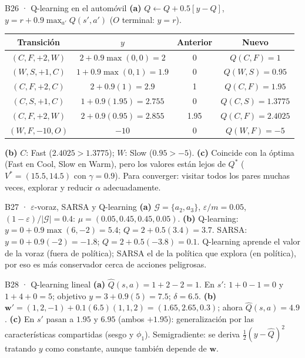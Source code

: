 \begin{solucion}{B26 · Q-learning en el automóvil}
\textbf{(a)} $Q\leftarrow Q+0.5[y-Q]$, $y=r+0.9\max_{a'}Q(s',a')$ ($O$ terminal: $y=r$).
\begin{center}\small
\begin{tabular}{c|c|c|c}
Transición & $y$ & Anterior & Nuevo\\\hline
$(C,F,+2,W)$ & $2+0.9\max(0,0)=2$ & 0 & $Q(C,F)=1$\\
$(W,S,+1,C)$ & $1+0.9\max(0,1)=1.9$ & 0 & $Q(W,S)=0.95$\\
$(C,F,+2,C)$ & $2+0.9(1)=2.9$ & 1 & $Q(C,F)=1.95$\\
$(C,S,+1,C)$ & $1+0.9(1.95)=2.755$ & 0 & $Q(C,S)=1.3775$\\
$(C,F,+2,W)$ & $2+0.9(0.95)=2.855$ & 1.95 & $Q(C,F)=2.4025$\\
$(W,F,-10,O)$ & $-10$ & 0 & $Q(W,F)=-5$
\end{tabular}
\end{center}
\textbf{(b)} $C$: Fast ($2.4025>1.3775$); $W$: Slow ($0.95>-5$).
\textbf{(c)} Coincide con la óptima (Fast en Cool, Slow en Warm), pero los valores están lejos de $Q^*$ ($V^*=(15.5,14.5)$ con $\gamma=0.9$).
Para converger: visitar todos los pares muchas veces, explorar y reducir $\alpha$ adecuadamente.
\end{solucion}

\begin{solucion}{B27 · $\varepsilon$-voraz, SARSA y Q-learning}
\textbf{(a)} $\mathcal G=\{a_2,a_3\}$, $\varepsilon/m=0.05$, $(1-\varepsilon)/|\mathcal G|=0.4$: $\mu=(\mathbf{0.05},\mathbf{0.45},\mathbf{0.45},\mathbf{0.05})$.
\textbf{(b)} Q-learning: $y=0+0.9\max(6,-2)=5.4$; $Q=2+0.5(3.4)=\mathbf{3.7}$. SARSA: $y=0+0.9(-2)=-1.8$; $Q=2+0.5(-3.8)=\mathbf{0.1}$.
Q-learning aprende el valor de la voraz (fuera de política); SARSA el de la política que explora (en política), por eso es más
conservador cerca de acciones peligrosas.
\end{solucion}

\begin{solucion}{B28 · Q-learning lineal}
\textbf{(a)} $\hat Q(s,a)=1+2-2=1$. En $s'$: $1+0-1=0$ y $1+4+0=5$; objetivo $y=3+0.9(5)=7.5$; $\delta=6.5$.
\textbf{(b)} $\mathbf w'=(1,2,-1)+0.1(6.5)(1,1,2)=(\mathbf{1.65},\mathbf{2.65},\mathbf{0.3})$; ahora $\hat Q(s,a)=4.9$.
\textbf{(c)} En $s'$ pasan a $1.95$ y $6.95$ (ambos $+1.95$): generalización por las características compartidas (sesgo y $\phi_1$).
Semigradiente: se deriva $\frac12(y-\hat Q)^2$ tratando $y$ como constante, aunque también depende de $\mathbf w$.
\end{solucion}

